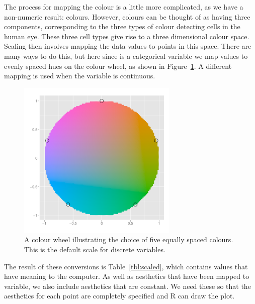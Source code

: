 The process for mapping the colour is a little more complicated, as we have a non-numeric result: colours. However, colours can be thought of as having three components, corresponding to the three types of colour detecting cells in the human eye. These three cell types give rise to a three dimensional colour space. Scaling then involves mapping the data values to points in this space. There are many ways to do this, but here since  is a categorical variable we map values to evenly spaced hues on the colour wheel, as shown in Figure~\ref{fig:colour-wheel}. A different mapping is used when the variable is continuous.

\begin{figure}[htbp]
  \centering
    \includegraphics[width=3in]{colour-wheel}
  \caption{A colour wheel illustrating the choice of five equally spaced colours.   This is the default scale for discrete variables.}
  \label{fig:colour-wheel}
\end{figure}

The result of these conversions is Table~\ref{tbl:scaled}, which contains values that have meaning to the computer. As well as aesthetics that have been mapped to variable, we also include aesthetics that are constant. We need these so that the aesthetics for each point are completely specified and R can draw the plot.




